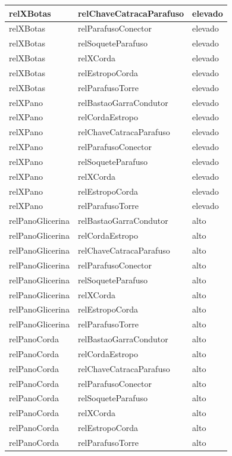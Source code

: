 \documentclass[12pt]{article}
\begin{document}
\begin{table}[H]
\begin{tabular}{|l|l|l|}
relXBotas & relChaveCatracaParafuso & elevado \\ \hline
relXBotas & relParafusoConector & elevado \\ \hline
relXBotas & relSoqueteParafuso & elevado \\ \hline
relXBotas & relXCorda & elevado \\ \hline
relXBotas & relEstropoCorda & elevado \\ \hline
relXBotas & relParafusoTorre & elevado \\ \hline
relXPano & relBastaoGarraCondutor & elevado \\ \hline
relXPano & relCordaEstropo & elevado \\ \hline
relXPano & relChaveCatracaParafuso & elevado \\ \hline
relXPano & relParafusoConector & elevado \\ \hline
relXPano & relSoqueteParafuso & elevado \\ \hline
relXPano & relXCorda & elevado \\ \hline
relXPano & relEstropoCorda & elevado \\ \hline
relXPano & relParafusoTorre & elevado \\ \hline
relPanoGlicerina & relBastaoGarraCondutor & alto \\ \hline
relPanoGlicerina & relCordaEstropo & alto \\ \hline
relPanoGlicerina & relChaveCatracaParafuso & alto \\ \hline
relPanoGlicerina & relParafusoConector & alto \\ \hline
relPanoGlicerina & relSoqueteParafuso & alto \\ \hline
relPanoGlicerina & relXCorda & alto \\ \hline
relPanoGlicerina & relEstropoCorda & alto \\ \hline
relPanoGlicerina & relParafusoTorre & alto \\ \hline
relPanoCorda & relBastaoGarraCondutor & alto \\ \hline
relPanoCorda & relCordaEstropo & alto \\ \hline
relPanoCorda & relChaveCatracaParafuso & alto \\ \hline
relPanoCorda & relParafusoConector & alto \\ \hline
relPanoCorda & relSoqueteParafuso & alto \\ \hline
relPanoCorda & relXCorda & alto \\ \hline
relPanoCorda & relEstropoCorda & alto \\ \hline
relPanoCorda & relParafusoTorre & alto \\ \hline

\end{tabular}
\end{table}
\end{document}
